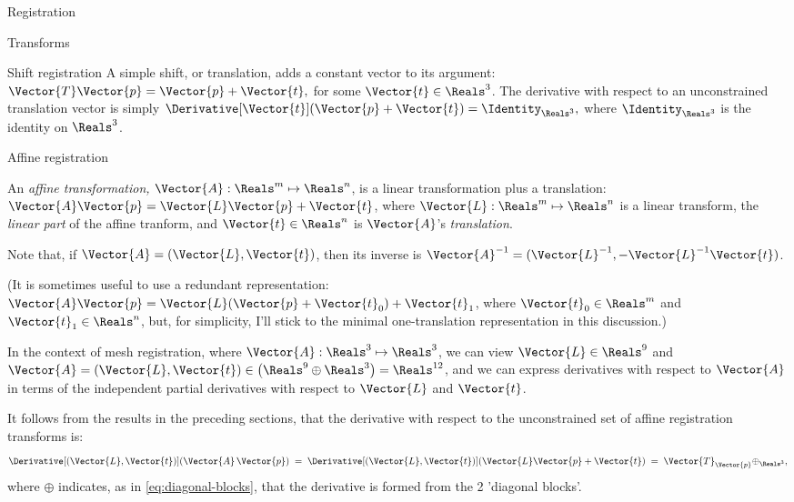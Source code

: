 \begin{plSection}{Registration}
\begin{plSection}{Transforms}
\begin{plSection}{Shift registration}
A simple shift, or translation, adds a constant vector
to its argument: $\Vector{T} \Vector{p} = \Vector{p} + \Vector{t},$
for some $\Vector{t} \in \Reals^3$.
The derivative with respect to
an unconstrained translation vector
is simply
$\Derivative[\Vector{t}]{(\Vector{p} + \Vector{t})} = \Identity_{\Reals^3},$
where $\Identity_{\Reals^3}$ is the identity on $\Reals^3$.

\end{plSection}%
\begin{plSection}{Affine registration}
\label{sec:affine-registration}

An {\it affine transformation,} $\Vector{A} : \Reals^m \mapsto \Reals^n$,
is a linear transformation plus a translation:
$\Vector{A} \Vector{p} = \Vector{L} \Vector{p} + \Vector{t}$,
where $\Vector{L} : \Reals^m \mapsto \Reals^n$ is a linear transform,
the {\it linear part} of the affine tranform,
and $\Vector{t} \in \Reals^n$ is $\Vector{A}$'s {\it translation}.

Note that, if $\Vector{A} = (\Vector{L},\Vector{t})$, then its inverse is
$\Vector{A}^{-1} = (\Vector{L}^{-1}, - \Vector{L}^{-1}\Vector{t})$.

(It is sometimes useful to use a redundant representation:
$\Vector{A} \Vector{p} = \Vector{L} (\Vector{p} + \Vector{t}_0) + \Vector{t}_1$,
where $\Vector{t}_0 \in \Reals^m$ and $\Vector{t}_1 \in \Reals^n$,
but, for simplicity, I'll stick to the minimal one-translation
representation in this discussion.)

In the context of mesh registration,
where $\Vector{A} : \Reals^3 \mapsto \Reals^3$,
we can view $\Vector{L} \in \Reals^9$ and
$\Vector{A} = (\Vector{L}, \Vector{t}) \in \left(\Reals^9 \oplus \Reals^3 \right)= \Reals^{12}$,
and we can express derivatives with respect to $\Vector{A}$
in terms of the independent partial derivatives
with respect to $\Vector{L}$ and $\Vector{t}$.

It follows from the results in the preceding sections,
that the derivative with respect to the
unconstrained set of affine registration transforms is:
\begin{equation}
\label{eq:affine-transform-derivative}
\Derivative[(\Vector{L},\Vector{t})]{\left( \Vector{A} \, \Vector{p} \right)}
 \; = \;
\Derivative[(\Vector{L},\Vector{t})]{\left( \Vector{L} \Vector{p} + \Vector{t} \right)}
 \; = \;
\Vector{T}_{\Vector{p}} \oplus _{\Reals^3},
\end{equation}
where $\oplus$ indicates,
as in \cref{eq:diagonal-blocks},
that the derivative is formed from the 2
'diagonal blocks'.


\end{plSection}
\end{plSection}
\end{plSection}
